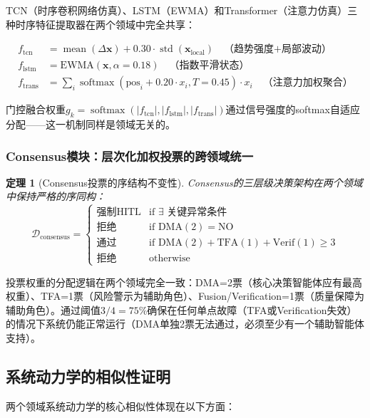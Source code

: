 \documentclass[11pt,a4paper]{ctexart}
\newtheorem{theorem}{定理}[section]
\theoremstyle{remark}
\DeclareMathOperator{\softmax}{softmax}
\begin{document}
TCN（时序卷积网络仿真）、LSTM（EWMA）和Transformer（注意力仿真）三种时序特征提取器在两个领域中完全共享：

\begin{align}
f_{\text{tcn}} &= \operatorname{mean}(\Delta \mathbf{x}) + 0.30 \cdot \operatorname{std}(\mathbf{x}_{\text{local}}) \quad \text{（趋势强度+局部波动）} \\
f_{\text{lstm}} &= \text{EWMA}(\mathbf{x}, \alpha=0.18) \quad \text{（指数平滑状态）} \\
f_{\text{trans}} &= \sum_i \softmax(\text{pos}_i + 0.20 \cdot x_i, T=0.45) \cdot x_i \quad \text{（注意力加权聚合）}
\end{align}

门控融合权重$g_k = \softmax(|f_{\text{tcn}}|, |f_{\text{lstm}}|, |f_{\text{trans}}|)$通过信号强度的softmax自适应分配——这一机制同样是领域无关的。

\subsubsection{Consensus模块：层次化加权投票的跨领域统一}

\begin{theorem}[Consensus投票的序结构不变性]
Consensus的三层级决策架构在两个领域中保持严格的序同构：
\begin{equation}
\mathcal{D}_{\text{consensus}} = \begin{cases}
\text{强制HITL} & \text{if } \exists \text{ 关键异常条件} \\
\text{拒绝} & \text{if } \text{DMA}(2) = \text{NO} \\
\text{通过} & \text{if } \text{DMA}(2) + \text{TFA}(1) + \text{Verif}(1) \geq 3 \\
\text{拒绝} & \text{otherwise}
\end{cases}
\end{equation}
\end{theorem}

投票权重的分配逻辑在两个领域完全一致：DMA=2票（核心决策智能体应有最高权重）、TFA=1票（风险警示为辅助角色）、Fusion/Verification=1票（质量保障为辅助角色）。通过阈值$3/4 = 75\%$确保在任何单点故障（TFA或Verification失效）的情况下系统仍能正常运行（DMA单独2票无法通过，必须至少有一个辅助智能体支持）。

\subsection{系统动力学的相似性证明}

两个领域系统动力学的核心相似性体现在以下方面：
\end{document}
